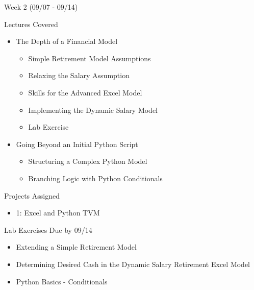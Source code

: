 \documentclass[]{article}
\begin{document}
\begin{section}{Week 2 (09/07 - 09/14)}
\begin{subsection}{Lectures Covered}
\begin{itemize}
\item The Depth of a Financial Model
\begin{itemize}
\item Simple Retirement Model Assumptions
\item Relaxing the Salary Assumption
\item Skills for the Advanced Excel Model
\item Implementing the Dynamic Salary Model
\item Lab Exercise
\end{itemize}
\end{itemize}
\begin{itemize}
\item Going Beyond an Initial Python Script
\begin{itemize}
\item Structuring a Complex Python Model
\item Branching Logic with Python Conditionals
\end{itemize}
\end{itemize}
\end{subsection}
\begin{subsection}{Projects Assigned}
\begin{itemize}
\item 1: Excel and Python TVM
\end{itemize}
\end{subsection}
\begin{subsection}{Lab Exercises Due by 09/14}
\begin{itemize}
\item Extending a Simple Retirement Model
\item Determining Desired Cash in the Dynamic Salary Retirement Excel Model
\item Python Basics - Conditionals
\end{itemize}
\end{subsection}
\end{section}
\end{document}
